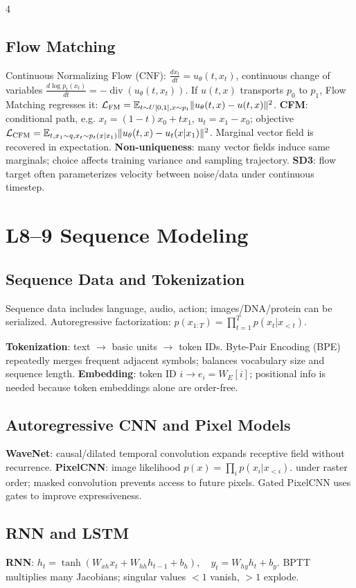 \documentclass{article}
\newcommand{\key}[1]{\textbf{#1}}
\newcommand{\E}{\mathbb{E}}
\newcommand{\1}{\mathbf 1}
\begin{document}
\begin{multicols*}{4}
\subsection{Flow Matching}
Continuous Normalizing Flow (CNF): $\frac{dx_t}{dt}=u_\theta(t,x_t)$, continuous change of variables $\frac{d\log p_t(x_t)}{dt}=-\operatorname{div}(u_\theta(t,x_t))$.
If $u(t,x)$ transports $p_0$ to $p_1$, Flow Matching regresses it:
$\mathcal L_{\rm FM}=\E_{t\sim U[0,1],x\sim p_t}\|u_\theta(t,x)-u(t,x)\|^2$.
\key{CFM}: conditional path, e.g. $x_t=(1-t)x_0+tx_1$, $u_t=x_1-x_0$; objective
$\mathcal L_{\rm CFM}=\E_{t,x_1\sim q,x_t\sim p_t(x|x_1)}
\|u_\theta(t,x)-u_t(x|x_1)\|^2$.
Marginal vector field is recovered in expectation. \key{Non-uniqueness}: many vector fields induce same marginals; choice affects training variance and sampling trajectory. \key{SD3}: flow target often parameterizes velocity between noise/data under continuous timestep.

\section{L8--9 Sequence Modeling}
\subsection{Sequence Data and Tokenization}
Sequence data includes language, audio, action; images/DNA/protein can be serialized. Autoregressive factorization:
\(
p(x_{1:T})=\prod_{t=1}^T p(x_t|x_{<t}).
\)

\key{Tokenization}: text $\to$ basic units $\to$ token IDs. Byte-Pair Encoding (BPE) repeatedly merges frequent adjacent symbols; balances vocabulary size and sequence length. \key{Embedding}: token ID $i\to e_i=W_E[i]$; positional info is needed because token embeddings alone are order-free.

\subsection{Autoregressive CNN and Pixel Models}
\key{WaveNet}: causal/dilated temporal convolution expands receptive field without recurrence. \key{PixelCNN}: image likelihood
\(
p(x)=\prod_i p(x_i|x_{<i}). 
\)
under raster order; masked convolution prevents access to future pixels. Gated PixelCNN uses gates to improve expressiveness.

\subsection{RNN and LSTM}
\key{RNN}:
\(
h_t=\tanh(W_{xh}x_t+W_{hh}h_{t-1}+b_h),\quad y_t=W_{hy}h_t+b_y.
\)
BPTT multiplies many Jacobians; singular values $<1$ vanish, $>1$ explode. 


\end{multicols*}
\end{document}
